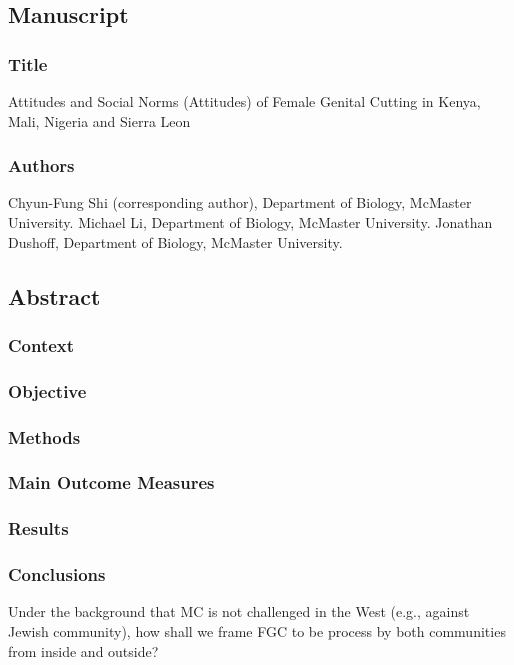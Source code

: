 \documentclass[12pt,]{article}
\date{}
\begin{document}
\subsection{Manuscript}\label{manuscript}

\subsubsection{Title}\label{title}

Attitudes and Social Norms (Attitudes) of Female Genital Cutting in Kenya, Mali, Nigeria and Sierra Leon

\subsubsection{Authors}\label{authors}

Chyun-Fung Shi (corresponding author), Department of Biology, McMaster
University. Michael Li, Department of Biology, McMaster University.
Jonathan Dushoff, Department of Biology, McMaster
University.

\subsection{Abstract}\label{abstract}

\subsubsection{Context}\label{context}

\subsubsection{Objective}\label{objective}

\subsubsection{Methods}\label{Methods}

\subsubsection{Main Outcome Measures}\label{main-outcome-measures}

\subsubsection{Results}\label{results}

\subsubsection{Conclusions}\label{conclusions}
Under the background that MC is not challenged in the West (e.g., against Jewish community), how  shall we frame FGC to be process by both communities from inside and outside?
\end{document}
